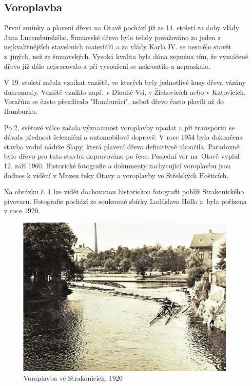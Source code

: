 \documentclass[thesis=M,czech]{FITthesis}[2012/06/26]
\begin{document}
\subsection{Voroplavba}
První zmínky o plavení dřeva na Otavě pochází již ze 14. století za doby vlády Jana Lucemburského. Šumavské dřevo bylo tehdy považováno za jeden z nejkvalitnějších stavebních materiálů a za vlády Karla IV. se nesmělo stavět z~jiných, než ze šumavských. Vysoká kvalita byla dána zejména tím, že vymáčené dřevo již dále nepracovalo a při vysoušení se nekroutilo a nepraskalo. 

V 19. století začala vznikat vaziště, ve kterých byly jednotlivé kusy dřeva vázány dohromady. Vaziště vzniklo např. v Dlouhé Vsi, v Žichovicích nebo v Katovicích. Vorařům se často přezdívalo "Hamburáci", neboť dřevo často plavili až do Hamburku. 

Po 2. světové válce začala významnost voroplavby upadat a při transportu se dávala přednost železniční a automobilové dopravě. V roce 1954 byla dokončena stavba vodní nádrže Slapy, která plavení dřeva definitivně ukončila. Paradoxně bylo dřevo pro tuto stavbu dopravováno po řece. Poslední vor na~Otavě vyplul 12. září 1960. Historické fotografie a dokumenty zachycující voroplavbu jsou dodnes k vidění v Muzeu řeky Otavy a voroplavby ve Střelských Hošticích. 

Na obrázku č. \ref{obrazek:voroplavba} lze vidět dochovanou historickou fotografii poblíž Strakonického pivovaru. Fotografie pochází ze soukromé sbírky Ladilslava Hölla a~byla pořízena v roce 1920.

\clearpage
\begin{figure}[h!]
	\centering
	\includegraphics[width=11cm]{pics/voroplavba.jpg}
	\caption{Voroplavba ve Strakonicích, 1920}
	\label{obrazek:voroplavba}
\end{figure}
\end{document}
